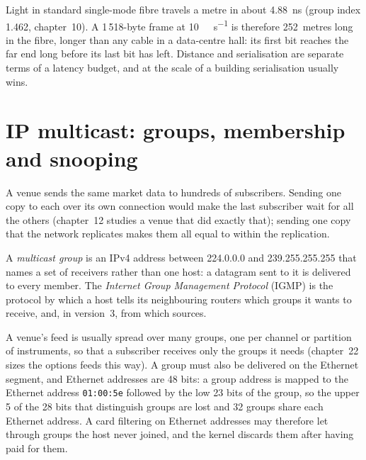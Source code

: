 \begin{remark}\label{rem:nw:networking-for-trading:flight}
Light in standard single-mode fibre travels a metre in about \qty{4.88}{\nano\second} (group index 1.462, chapter~10).
A 1\,518-byte frame at \qty{10}{\giga\bit\per\second} is therefore 252~metres long in the fibre, longer than any cable in a
data-centre hall: its first bit reaches the far end long before its last bit has left. Distance and serialisation are separate
terms of a latency budget, and at the scale of a building serialisation usually wins.
\end{remark}

\label{lst:nw:networking-for-trading:frame}

\section{IP multicast: groups, membership and snooping}

A venue sends the same market data to hundreds of subscribers. Sending one copy to each over its own connection would make
the last subscriber wait for all the others (chapter~12 studies a venue that did exactly that); sending one copy that the
network replicates makes them all equal to within the replication.

\begin{definition}\label{def:nw:networking-for-trading:group}
A \emph{multicast group} is an IPv4 address between 224.0.0.0 and 239.255.255.255 that names a set of
receivers rather than one host: a datagram sent to it is delivered to every member. The \emph{Internet Group Management
Protocol} (IGMP) is the protocol by which a host tells its neighbouring routers
which groups it wants to receive, and, in version~3, from which sources.
\end{definition}

A venue's feed is usually spread over many groups, one per channel or partition of instruments, so that a subscriber
receives only the groups it needs (chapter~22 sizes the options feeds this way). A group must also be delivered on the
Ethernet segment, and Ethernet addresses are 48 bits: a group address is mapped to the Ethernet address
\texttt{01:00:5e} followed by the low 23 bits of the group, so the upper 5 of the 28 bits that distinguish groups are lost and
32 groups share each Ethernet address. A card filtering on Ethernet addresses may therefore let through groups the host never
joined, and the kernel discards them after having paid for them.

